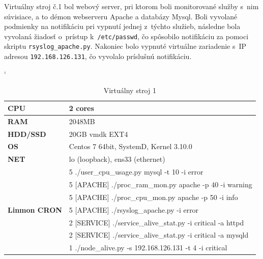 Virtuálny stroj č.1 bol webový server, pri ktorom boli monitorované služby s~nim súvisiace, a to démon webserveru Apache a databázy Mysql. Boli vyvolané podmienky na notifikáciu pri vypnutí jednej z~týchto služieb, následne bola vyvolaná žiadosť o~prístup k~\texttt{/etc/passwd}, čo spôsobilo notifikáciu za pomoci skriptu \texttt{rsyslog\_apache.py}. Nakoniec bolo vypnuté virtuálne zariadenie s~IP adresou \texttt{192.168.126.131}, čo vyvolalo príslušnú notifikáciu.
\\
\begin{table}[H]
	\catcode`
	\begin{center}
		\begin{tabular}{|l|l|}
			\hline
			\textbf{CPU} & 2 cores \\
			\hline
			\textbf{RAM} & 2048MB  \\
			\hline
			\textbf{HDD/SSD} & 20GB vmdk EXT4 \\
			\hline
			\textbf{OS} & Centos 7 64bit, SystemD, Kernel 3.10.0 \\
			\hline
			\textbf{NET}& lo (loopback), ens33 (ethernet)\\
			\hline
			\multirow{7}{*}{\textbf{Linmon CRON}}  & 5 ./user\_cpu\_usage.py mysql -t 10 -i error\\
			& 5 [APACHE] ./proc\_ram\_mon.py apache -p 40 -i warning\\
			& 5 [APACHE] ./proc\_cpu\_mon.py apache -p 50 -i info\\
			& 5 [APACHE] ./rsyslog\_apache.py -i error\\
			& 2 [SERVICE] ./service\_alive\_stat.py -i critical -a httpd\\
			& 2 [SERVICE] ./service\_alive\_stat.py -i critical -a mysqld\\
			& 1 ./node\_alive.py -s 192.168.126.131 -t 4 -i critical\\
			\hline			
		\end{tabular}
		\caption{Virtuálny stroj 1}
		\label{virt_dev1}
	\end{center}
\end{table}

